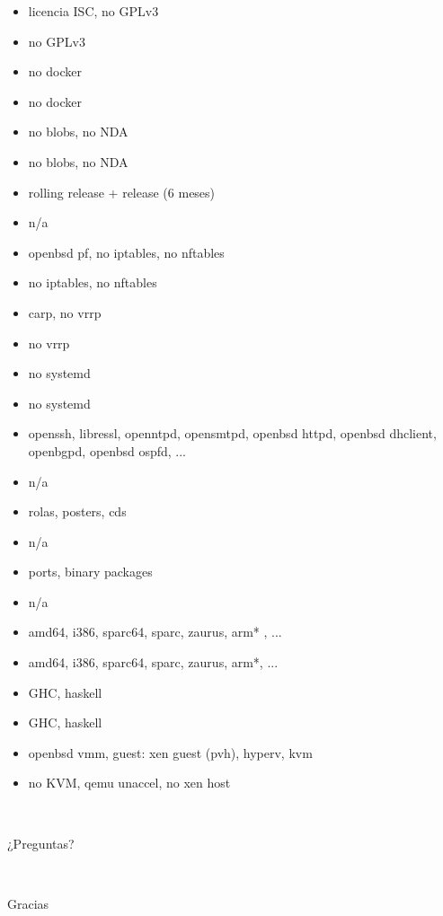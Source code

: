 \documentclass[11pt,spanish]{article}
\newcommand{\rowsp}[1][1em]{\vspace{#1}}
\newcommand{\hone}[1]{{\rowsp[0.3em]\noindent\Large #1 \rowsp[0.3em]}}
\newcommand{\myitm}[1]{\begin{itemize}#1\end{itemize}}
\newcommand{\pros}{\item[pros:]}
\newcommand{\cons}{\item[cons:]}
\begin{document}
\begin{multicols}{2}
\myitm{
	\pros licencia ISC, no GPLv3
	\cons no GPLv3

	\pros no docker
	\cons no docker

	\pros no blobs, no NDA
	\cons no blobs, no NDA

	\columnbreak

	\pros rolling release + release (6 meses)
	\cons n/a

	\pros openbsd pf, no iptables, no nftables
	\cons no iptables, no nftables

	\pros carp, no vrrp
	\cons no vrrp

	\pros no systemd
	\cons no systemd

	\newpage
	\pros openssh, libressl, openntpd, opensmtpd, openbsd httpd, openbsd
		dhclient, openbgpd, openbsd ospfd, ...
	\cons n/a

	\pros rolas, posters, cds
	\cons n/a

	\pros ports, binary packages
	\cons n/a

	\pros amd64, i386, sparc64, sparc, zaurus, arm* , ...
	\cons amd64, i386, sparc64, sparc, zaurus, arm*, ...

	\columnbreak
	\pros GHC, haskell
	\cons GHC, haskell

	\pros openbsd vmm, guest: xen guest (pvh), hyperv, kvm
	\cons no KVM, qemu unaccel, no xen host
}
\end{multicols}

\newpage %
\ 
\begin{center}
\hone{¿Preguntas?}
\end{center}

\newpage %
\ 
\vspace{\stretch{1}}
\begin{center}
\hone{Gracias}
\end{center}

\label{lastpage}
\end{document}
